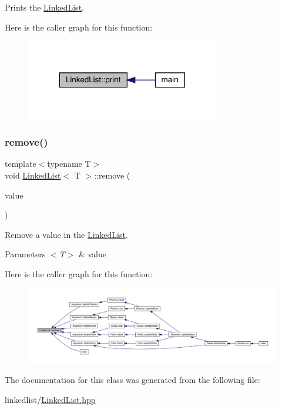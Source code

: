 Prints the \mbox{\hyperlink{class_linked_list}{Linked\+List}}. 

Here is the caller graph for this function\+:\nopagebreak
\begin{figure}[H]
\begin{center}
\leavevmode
\includegraphics[width=240pt]{class_linked_list_a9675767b81fb9f1d8799444e4ee7f43b_icgraph}
\end{center}
\end{figure}
\mbox{\label{class_linked_list_ad9b63a24343b67236dcf119e66066c24}} 
\subsubsection{\texorpdfstring{remove()}{remove()}}
{\footnotesize\ttfamily template$<$typename T$>$ \\
void \mbox{\hyperlink{class_linked_list}{Linked\+List}}$<$ T $>$\+::remove (\begin{DoxyParamCaption}\item[{T}]{value }\end{DoxyParamCaption})\hspace{0.3cm}{\ttfamily [inline]}}



Remove a value in the \mbox{\hyperlink{class_linked_list}{Linked\+List}}. 


\begin{DoxyParams}{Parameters}
{\em $<$\+T$>$} & value \\
\hline
\end{DoxyParams}
Here is the caller graph for this function\+:\nopagebreak
\begin{figure}[H]
\begin{center}
\leavevmode
\includegraphics[width=350pt]{class_linked_list_ad9b63a24343b67236dcf119e66066c24_icgraph}
\end{center}
\end{figure}


The documentation for this class was generated from the following file\+:\begin{DoxyCompactItemize}
\item 
linkedlist/\mbox{\hyperlink{_linked_list_8hpp}{Linked\+List.\+hpp}}\end{DoxyCompactItemize}

